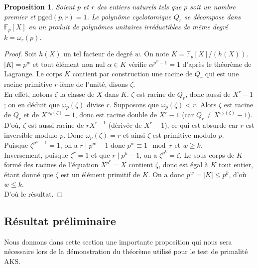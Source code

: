 \documentclass[11pt]{article}
\newtheorem{prop}{Proposition}[subsection]
\newcommand{\pgcd}{\mathrm{pgcd}}
\begin{document}
\begin{prop}
Soient $p$ et $r$ des entiers naturels tels que $p$ soit un nombre premier et $\pgcd(p,r)=1$. Le polynôme cyclotomique $Q_r$ se décompose dans $\mathbb{F}_p[X]$ en un produit de polynômes unitaires irréductibles de même degré $k=\omega_r(p)$.
\end{prop}

\begin{small}
\begin{proof}
Soit $h(X)$ un tel facteur de degré $w$. On note $K=\mathbb{F}_p[X]/(h(X))$.\\

\noindent
$\vert K \vert = p^w$ et tout élément non nul $\alpha \in K$ vérifie $\alpha^{p^w-1}=1$ d'après le théorème de Lagrange. Le corps $K$ contient par construction une racine de $Q_r$ qui est une racine primitive $r$-ième de l'unité, disons $\zeta$.\\
\noindent
En effet, notons $\zeta$ la classe de $X$ dans $K$. $\zeta$ est racine de $Q_r$, donc aussi de $X^r-1$ ; on en déduit que $\omega_p(\zeta)$ divise $r$. Supposons que $\omega_p(\zeta)<r$. Alors $\zeta$ est racine de $Q_r$ et de $X^{\omega_p(\zeta)}-1$, donc est racine double de $X^r-1$ (car $Q_r \not = X^{\omega_p(\zeta)}-1$). D'où, $\zeta$ est aussi racine de $rX^{r-1}$ (dérivée de $X^r-1$), ce qui est absurde car $r$ est inversible modulo $p$. Donc $\omega_p(\zeta)=r$ et ainsi $\zeta$ est primitive modulo $p$.\\
\noindent
Puisque $\zeta^{p^w-1}=1$, on a $r \mid p^w-1$ donc $p^w \equiv 1 \mod r$ et $w \geqslant k$.\\

\noindent
Inversement, puisque $\zeta^r=1$ et que $r \mid p^k-1$, on a $\zeta^{p^k}=\zeta$. Le sous-corps de $K$ formé des racines de l'équation $X^{p^k}=X$ contient $\zeta$, donc est égal à $K$ tout entier, étant donné que $\zeta$ est un élément primitif de $K$. On a donc $p^w=\vert K \vert \leqslant p^k$, d'où $w \leqslant k$.\\

\noindent
D'où le résultat.
\end{proof}
\end{small}

\subsection{Résultat préliminaire}

Nous donnons dans cette section une importante proposition qui nous sera nécessaire lors de la démonstration du théorème utilisé pour le test de primalité AKS.
\end{document}
